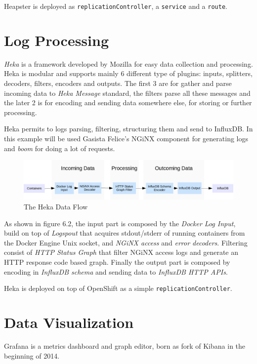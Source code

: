 Heapster is deployed as \texttt{replicationController}, a \texttt{service} and a \texttt{route}.

\section{Log Processing}\label{log-processing}

\textit{Heka} is a framework developed by Mozilla for easy data collection and processing. Heka is modular and supports mainly 6 different type of plugins: inputs, splitters, decoders, filters, encoders and outputs. The first 3 are for gather and parse incoming data to \textit{Heka Message} standard, the filters parse all these messages and the later 2 is for encoding and sending data somewhere else, for storing or further processing.

Heka permits to logs parsing, filtering, structuring them and send to InfluxDB. In this example will be used Gasista Felice's NGiNX component for generating logs and \textit{boom} for doing a lot of requests.

\begin{figure}[htbp]
\centering
\includegraphics{media/ch6-heka.png}
\caption{The Heka Data Flow}
\end{figure}

As shown in figure 6.2, the input part is composed by the \textit{Docker Log Input}, build on top of \textit{Logspout} that acquires stdout/stderr of running containers from the Docker Engine Unix socket, and \textit{NGiNX access} and \textit{error decoders}.  Filtering consist of \textit{HTTP Status Graph} that filter NGiNX access logs and generate an HTTP response code based graph.  Finally the output part is composed by encoding in \textit{InfluxDB schema} and sending data to \textit{InfluxDB HTTP APIs}.

Heka is deployed on top of OpenShift as a simple \texttt{replicationController}.

\section{Data Visualization}\label{data-visualization}

Grafana is a metrics dashboard and graph editor, born as fork of Kibana in the beginning of 2014.

